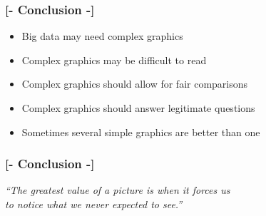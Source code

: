 \documentclass[xcolor=x11names,compress, aspectratio=169]{beamer}
\renewcommand{\(}{\begin{columns}}
\renewcommand{\)}{\end{columns}}
\newcommand{\<}[1]{\begin{column}{#1}}
\renewcommand{\>}{\end{column}}
\begin{document}
\begin{frame}
\begin{center}
\begin{itemize}

\end{itemize}
\end{center}
\end{frame}

\begin{frame}
\frametitle{\textcolor{brique}{[- \textbf{Conclusion} -]}}
\begin{center}
\begin{itemize}[<+-|alert@+>]
\item Big data may need complex graphics
\item Complex graphics may be difficult to read
\item Complex graphics should allow for fair comparisons
\item Complex graphics should answer legitimate questions
\item Sometimes several simple graphics are better than one
\end{itemize}
\end{center}
\end{frame}


\begin{frame}
\frametitle{\textcolor{brique}{[- \textbf{Conclusion} -]}}
\begin{center}
\emph{“The greatest value of a picture is when it forces us \\ to notice what we never expected to see.”}\\

\hfill \cite{Tukey1977}
\end{center}
\end{frame}
\end{document}
